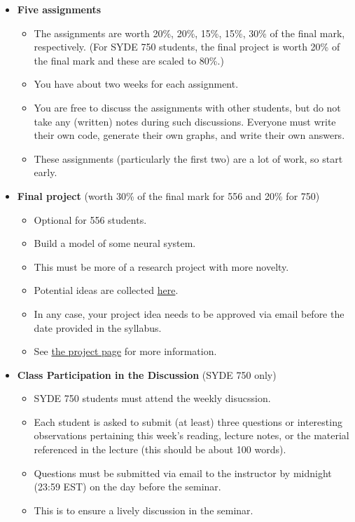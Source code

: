 \documentclass[10pt,letterpaper,oneside]{article}
\begin{document}
\begin{itemize}
	\item \textbf{Five assignments} 
	\begin{itemize}
		\item The assignments are worth 20\%, 20\%, 15\%, 15\%, 30\% of the final mark, respectively. (For SYDE 750 students, the final project is worth 20\% of the final mark and these are scaled to 80\%.)
		\item You have about two weeks for each assignment.
		\item You are free to discuss the assignments with other students, but do not take any (written) notes during such discussions. Everyone must write their own code, generate their own graphs, and write their own answers.
		\item These assignments (particularly the first two) are a lot of work, so start early.
	\end{itemize}
	\item \textbf{Final project} (worth 30\% of the final mark for 556 and 20\% for 750)
	\begin{itemize}
		\item Optional for 556 students.
    \item Build a model of some neural system.
		\item This must be more of a research project with more novelty.
		\item Potential ideas are collected \href{http://compneuro.uwaterloo.ca/courses/syde-750/syde-556-possible-projects.html}{here}.
		\item In any case, your project idea needs to be approved via email before the date provided in the syllabus.
		\item See \href{http://compneuro.uwaterloo.ca/courses/syde-750/syde-556-possible-projects.html}{the project page} for more information.
	\end{itemize}
	\item \textbf{Class Participation in the Discussion}  (SYDE 750 only)
	\begin{itemize}
		\item SYDE 750 students must attend the weekly disucssion.
		\item Each student is asked to submit (at least) three questions or interesting observations pertaining this week's reading, lecture notes, or the material referenced in the lecture (this should be about 100 words).
		\item Questions must be submitted via email to the instructor by midnight (23:59 EST) on the day before the seminar.
		\item This is to ensure a lively discussion in the seminar.
	\end{itemize}
\end{itemize}
\end{document}
